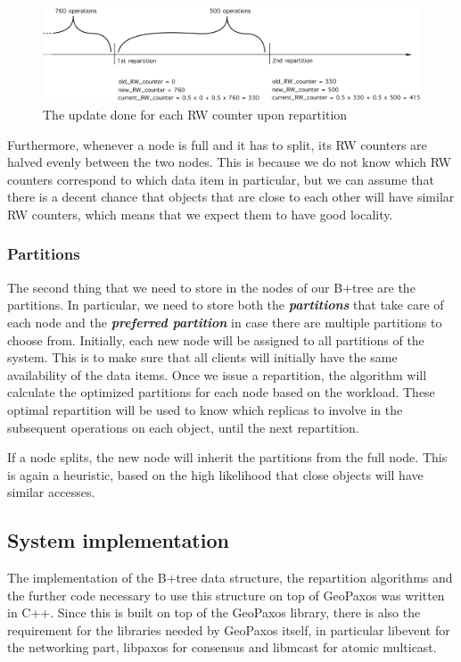 \begin{figure}[!htb]
  \centering
  \includegraphics[width=\textwidth,height=\textheight,keepaspectratio]{img/RW_counters.png}
  \caption{ The update done for each RW counter upon repartition }
  \label{fig:RW counters}
\end{figure}

Furthermore, whenever a node is full and it has to split, its RW counters are halved evenly between the two nodes. This is because we do not know which RW counters correspond to which data item in particular, but we can assume that there is a decent chance that objects that are close to each other will have similar RW counters, which means that we expect them to have good locality.

\subsubsection{Partitions}
The second thing that we need to store in the nodes of our B+tree are the partitions. In particular, we need to store both the \textbf{\emph{partitions}} that take care of each node and the \textbf{\emph{preferred partition}} in case there are multiple partitions to choose from. Initially, each new node will be assigned to all partitions of the system. This is to make sure that all clients will initially have the same availability of the data items. Once we issue a repartition, the algorithm will calculate the optimized partitions for each node based on the workload. These optimal repartition will be used to know which replicas to involve in the subsequent operations on each object, until the next repartition.

If a node splits, the new node will inherit the partitions from the full node. This is again a heuristic, based on the high likelihood that close objects will have similar accesses.

\subsection{System implementation}\label{sec:system-implementation}
The implementation of the B+tree data structure, the repartition algorithms and the further code necessary to use this structure on top of GeoPaxos was written in C++. Since this is built on top of the GeoPaxos library, there is also the requirement for the libraries needed by GeoPaxos itself, in particular libevent\citep{libevent} for the networking part, libpaxos for consensus\citep{libpaxos} and libmcast\citep{libmcast} for atomic multicast.

